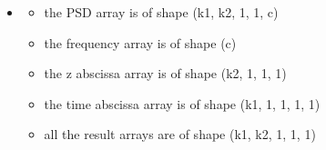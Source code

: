 \documentclass[letterpaper,10pt,english]{sphinxmanual}
\begin{document}
\begin{itemize}
\begin{description}
\begin{itemize}
\item {} 
\sphinxAtStartPar
the time abscissa array is of shape (k1, 1, 1, 1, 1)

\item {} 
\sphinxAtStartPar
all the result arrays are of shape (k1, 1, 1 k2, 1)

\end{itemize}

\end{description}

\item {} \begin{description}
\begin{itemize}
\item {} 
\sphinxAtStartPar
the PSD array is of shape (k1, k2, 1,  1, c)

\item {} 
\sphinxAtStartPar
the frequency array is of shape (c)

\item {} 
\sphinxAtStartPar
the z abscissa array is of shape (k2, 1, 1, 1)

\item {} 
\sphinxAtStartPar
the time abscissa array is of shape (k1, 1, 1, 1, 1)

\item {} 
\sphinxAtStartPar
all the result arrays are of shape (k1, k2, 1, 1, 1)

\end{itemize}

\end{description}

\end{itemize}
\end{document}
